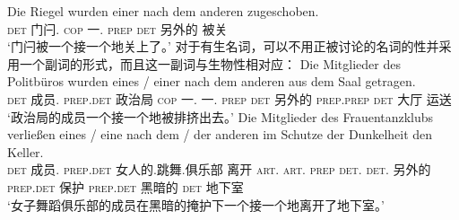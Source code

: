 \ex 
\gll Die Riegel wurden einer nach dem anderen zugeschoben.\\
	 \textsc{det} 门闩.\mas{} \textsc{cop} 一.\mas{} \textsc{prep} \textsc{det} 另外的 被关\\
\glt `门闩被一个接一个地关上了。'
\zl
对于有生名词，可以不用正被讨论的名词的性并采用一个副词的形式，而且这一副词与生物性相对应：
\eal
\ex 
\gll Die Mitglieder des Politbüros wurden eines / einer nach dem anderen aus dem Saal getragen.\\
	 \textsc{det} 成员.\neu{} \textsc{prep}.\textsc{det} 政治局 \textsc{cop} 一.\neu{} {} 一.\mas{} \textsc{prep} \textsc{det} 另外的 \textsc{prep}.\textsc{prep} \textsc{det} 大厅 运送\\
\glt `政治局的成员一个接一个地被排挤出去。'
\ex 
\gll Die Mitglieder des Frauentanzklubs verließen eines / eine nach dem / der anderen im Schutze der Dunkelheit den
Keller.\\
\textsc{det} 成员.\neu{} \textsc{prep}.\textsc{det} 女人的.跳舞.俱乐部 离开 \textsc{art}.\neu{} {} \textsc{art}.\fem{} \textsc{prep} \textsc{det}.\neu{} {} \textsc{det}.\fem{} 另外的 \textsc{prep}.\textsc{det} 保护 \textsc{prep}.\textsc{det} 黑暗的 \textsc{det}
地下室\\
\glt `女子舞蹈俱乐部的成员在黑暗的掩护下一个接一个地离开了地下室。'
\zl
